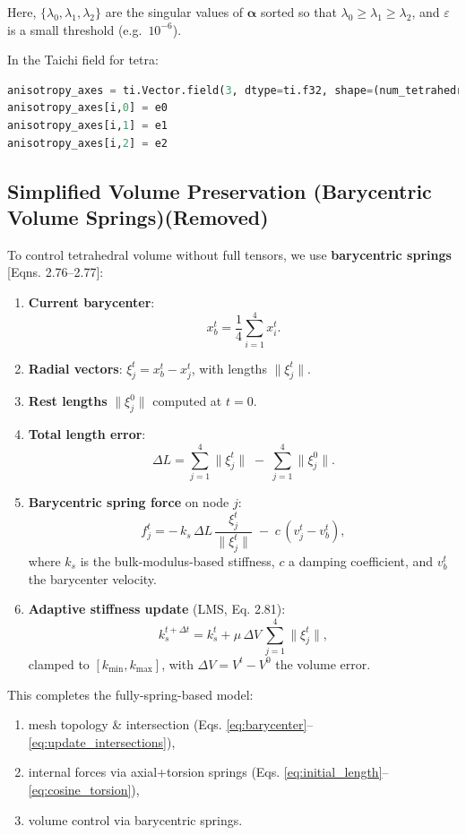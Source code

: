 \documentclass{article}
\begin{document}
\bigskip
Here, \(\{\lambda_{0},\lambda_{1},\lambda_{2}\}\) are the singular values of \(\mathbf \alpha\) 
sorted so that \(\lambda_{0}\ge\lambda_{1}\ge\lambda_{2}\), 
and \(\varepsilon\) is a small threshold (e.g.\ \(10^{-6}\)).  

In the Taichi field for tetra:
\begin{lstlisting}[language=Python]
anisotropy_axes = ti.Vector.field(3, dtype=ti.f32, shape=(num_tetrahedra, 3))
anisotropy_axes[i,0] = e0
anisotropy_axes[i,1] = e1
anisotropy_axes[i,2] = e2
\end{lstlisting}




\subsection{Simplified Volume Preservation (Barycentric Volume Springs)(Removed)}

To control tetrahedral volume without full tensors, we use \textbf{barycentric springs} [Eqns. 2.76–2.77]:
\begin{enumerate}
    \item \textbf{Current barycenter}:
    $$
    x_b^t=\frac{1}{4}\sum_{i=1}^4 x_i^t.
    $$
    \item \textbf{Radial vectors}: $\xi^t_j=x_b^t - x_j^t$, with lengths $\|\xi^t_j\|$.
    
    \item \textbf{Rest lengths} $\|\xi^0_j\|$ computed at $t=0$.
    
    \item \textbf{Total length error}:
    $$
    \Delta L=\sum_{j=1}^4\|\xi_j^t\| \;-\;\sum_{j=1}^4\|\xi_j^0\|.
    $$
    
    \item \textbf{Barycentric spring force} on node $j$:
    $$
    f^t_j = -\,k_s\,\Delta L\,\frac{\xi^t_j}{\|\xi^t_j\|} \;-\;c\,(v_j^t - v_b^t),
    $$
    where $k_s$ is the bulk-modulus-based stiffness, $c$ a damping coefficient, and $v_b^t$ the barycenter velocity.
    
    \item \textbf{Adaptive stiffness update} (LMS, Eq. 2.81):
    $$
    k_s^{t+\Delta t} = k_s^t + \mu\,\Delta V\,\sum_{j=1}^4\|\xi_j^t\|,
    $$
    clamped to $[k_{\min},k_{\max}]$, with $\Delta V=V^t-V^0$ the volume error.
\end{enumerate}

This completes the fully-spring-based model:
\begin{enumerate}
    \item mesh topology \& intersection (Eqs. \ref{eq:barycenter}–\ref{eq:update_intersections}),
    \item internal forces via axial+torsion springs (Eqs. \ref{eq:initial_length}–\ref{eq:cosine_torsion}),
    \item volume control via barycentric springs.
\end{enumerate}
\end{document}
